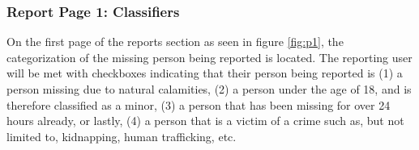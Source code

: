 \subsubsection{Report Page 1: Classifiers}

On the first page of the reports section as seen in figure \ref{fig:p1}, the categorization of the missing person being reported is located. The reporting user will be met with checkboxes indicating that their person being reported is (1) a person missing due to natural calamities, (2) a person under the age of 18, and is therefore classified as a minor, (3) a person that has been missing for over 24 hours already, or lastly, (4) a person that is a victim of a crime such as, but not limited to, kidnapping, human trafficking, etc.
\begin{figure}[!h]
    \centering
    \begin{subfigure}[c]{0.30\linewidth}
        \centering

\end{subfigure}
\end{figure}
